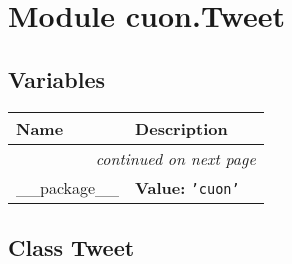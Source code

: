 %
%
%


\section{Module cuon.Tweet}

    \label{cuon:Tweet}


  \subsection{Variables}

    \vspace{-1cm}
\hspace{\varindent}\begin{longtable}{|p{\varnamewidth}|p{\vardescrwidth}|l}
\cline{1-2}
\cline{1-2} \centering \textbf{Name} & \centering \textbf{Description}& \\
\cline{1-2}
\endhead\cline{1-2}\multicolumn{3}{r}{\small\textit{continued on next page}}\\\endfoot\cline{1-2}
\endlastfoot\raggedright \_\-\_\-p\-a\-c\-k\-a\-g\-e\-\_\-\_\- & \raggedright \textbf{Value:} 
{\tt \texttt{'}\texttt{cuon}\texttt{'}}&\\
\cline{1-2}
\end{longtable}



\subsection{Class Tweet}

